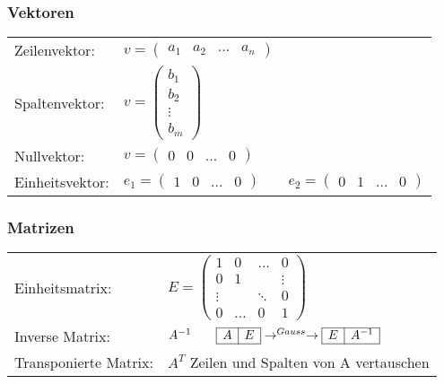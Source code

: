 	\subsubsection{Vektoren}
		\begin{tabular}{ll}
			Zeilenvektor: & $v = \left(\begin{array}{cccc} a_1 & a_2 & \ldots & a_n \end{array}\right)$ \\
			Spaltenvektor: & $v = \left(\begin{array}{c} b_1 \\ b_2 \\ \vdots \\ b_m \end{array}\right)$ \\
			Nullvektor: & $v = \left(\begin{array}{cccc} 0 & 0 & \ldots & 0 \end{array}\right)$\\
			Einheitsvektor: & $e_1 = \left(\begin{array}{cccc} 1 & 0 & \ldots & 0 \end{array}\right) \qquad 
					e_2 = \left(\begin{array}{cccc} 0 & 1 & \ldots & 0 \end{array}\right)$
		\end{tabular}
	
	\subsubsection{Matrizen}
		\begin{tabular}{ll}
			Einheitsmatrix: & $E = \left(\begin{array}{cccc}
				1 & 0 & \ldots & 0 \\
				0 & 1 &  & \vdots \\
				\vdots &  & \ddots & 0\\
				0 & \ldots & 0 & 1 \end{array}\right)$ \\
			Inverse Matrix: & $A^{-1} \qquad \begin{array}{|c|c|} \hline A & E \\ \hline \end{array} \rightarrow^{Gauss} \rightarrow
					\begin{array}{|c|c|} \hline E & A^{-1} \\ \hline \end{array} $ \\
			Transponierte Matrix: & $A^T$ \qquad Zeilen und Spalten von A vertauschen	
		\end{tabular}

